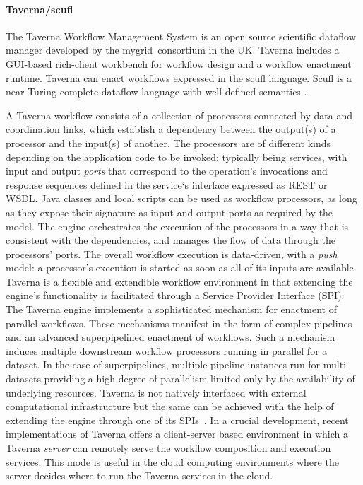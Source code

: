 \paragraph{Taverna/scufl} The Taverna Workflow Management System
\cite{taverna2013} is an open source scientific dataflow manager
developed by the mygrid~consortium in the UK.
%
Taverna includes a GUI-based rich-client workbench for workflow design and a
workflow enactment runtime. Taverna can enact workflows expressed in the scufl
language. Scufl is a near Turing complete dataflow language with well-defined
semantics \cite{turi-missier-etal:2007,glatard-montagnat:2008}. 

A Taverna workflow consists of a collection of processors connected by data and
coordination links, which establish a dependency between the output(s) of a
processor and the input(s) of another. The processors are of different kinds
depending on the application code to be invoked: typically being services, with
input and output \textit{ports} that correspond to the operation's invocations
and response sequences defined in the service`s interface expressed as REST or WSDL.
Java classes and local scripts can be used as workflow processors, as long as
they expose their signature as input and output ports as required by the model.
The engine orchestrates the execution of the processors in a way that is
consistent with the dependencies, and manages the flow of data through the
processors' ports. The overall workflow execution is data-driven, with a
\emph{push} model: a processor's execution is started as soon as all of its
inputs are available. Taverna is a flexible and extendible workflow environment
\cite{missier-soiland-reyes-etal:2010,sroka2009a} in that extending the
engine's functionality is facilitated through a Service Provider Interface
(SPI). The Taverna engine implements a sophisticated mechanism for enactment of
parallel workflows. These mechanisms manifest in the form of complex pipelines
and an advanced superpipelined enactment of workflows. Such a mechanism induces
multiple downstream workflow processors running in parallel for a dataset. In
the case of superpipelines, multiple pipeline instances run for multi-datasets
providing a high degree of parallelism limited only by the availability of
underlying resources. Taverna is not natively interfaced with external
computational infrastructure but the same can be achieved with the help of
extending the engine through one of its
SPIs~\cite{maheshwari-missier-etal:2009}. In a crucial development, recent
implementations of Taverna offers a client-server based environment in which a
Taverna \emph{server} can remotely serve the workflow composition and execution
services. This mode is useful in the cloud computing environments where the
server decides where to run the Taverna services in the cloud.
